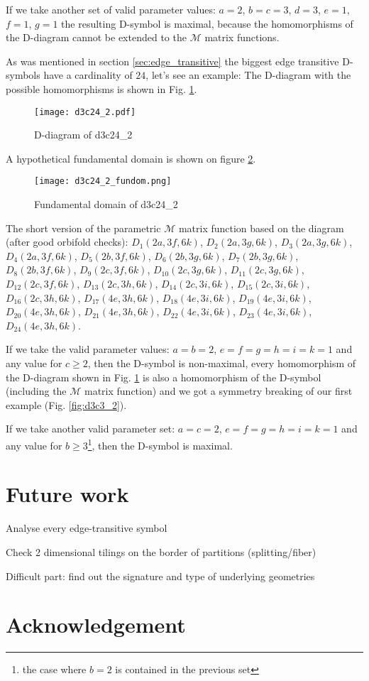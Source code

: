 \documentclass[12pt,a4paper]{article}
\numberwithin{equation}{section}
\theoremstyle{plain}%
\theoremstyle{definition}
\theoremstyle{remark}
\begin{document}
If we take another set of valid parameter values: $a=2$, $b=c=3$, $d=3$, $e=1$,
$f=1$, $g=1$ the resulting D-symbol is maximal, because the homomorphisms of the
D-diagram cannot be extended to the $\mathcal{M}$ matrix functions.

As was mentioned in section \ref{sec:edge_transitive} the biggest edge
transitive D-symbols have a cardinality of $24$, let's see an example:
The D-diagram with the possible homomorphisms is shown in Fig.
\ref{fig:d3c24_2}.

\begin{figure}
  \caption{\label{fig:d3c24_2} D-diagram of d3c24\_2}
  \center
  \texttt{[image: d3c24\_2.pdf]}
\end{figure}

A hypothetical fundamental domain is shown on figure \ref{fig:d3c24_2_fundom}.

\begin{figure}
  \caption{\label{fig:d3c24_2_fundom} Fundamental domain of d3c24\_2}
  \center
  \texttt{[image: d3c24\_2\_fundom.png]}
\end{figure}

The short version of the parametric $\mathcal{M}$ matrix function based on the
diagram (after good orbifold checks): $D_1(2a, 3f, 6k)$, $D_2(2a, 3g, 6k)$,
$D_3(2a, 3g, 6k)$, $D_4(2a, 3f, 6k)$, $D_5(2b, 3f, 6k)$, $D_6(2b, 3g, 6k)$,
$D_7(2b, 3g, 6k)$, $D_8(2b, 3f, 6k)$, $D_9(2c, 3f, 6k)$, $D_{10}(2c, 3g, 6k)$,
$D_{11}(2c, 3g, 6k)$, $D_{12}(2c, 3f, 6k)$, $D_{13}(2c, 3h, 6k)$, $D_{14}(2c,
3i, 6k)$, $D_{15}(2c, 3i, 6k)$, $D_{16}(2c, 3h, 6k)$, $D_{17}(4e, 3h, 6k)$,
$D_{18}(4e, 3i, 6k)$, $D_{19}(4e, 3i, 6k)$, $D_{20}(4e, 3h, 6k)$, $D_{21}(4e,
3h, 6k)$, $D_{22}(4e, 3i, 6k)$, $D_{23}(4e, 3i, 6k)$, $D_{24}(4e, 3h, 6k)$.

If we take the valid parameter values: $a=b=2$, $e=f=g=h=i=k=1$ and any value
for $c\geq2$, then the D-symbol is non-maximal, every homomorphism of the
D-diagram shown in Fig. \ref{fig:d3c24_2} is also a homomorphism of the D-symbol
(including the $\mathcal{M}$ matrix function) and we got a symmetry breaking of
our first example (Fig. \ref{fig:d3c3_2}).

If we take another valid parameter set: $a=c=2$, $e=f=g=h=i=k=1$ and any value
for $b\geq3$\footnote{the case where $b=2$ is contained in the previous set},
then the D-symbol is maximal.

\section{Future work}
Analyse every edge-transitive symbol

Check 2 dimensional tilings on the border of partitions (splitting/fiber)

Difficult part: find out the signature and type of underlying geometries

\section{Acknowledgement}


\nocite{DHM93,D87,Du88,H93,LM90,Ma67,M94,T82,VS93,F94,M11,DDH98,K11}


\end{document}

